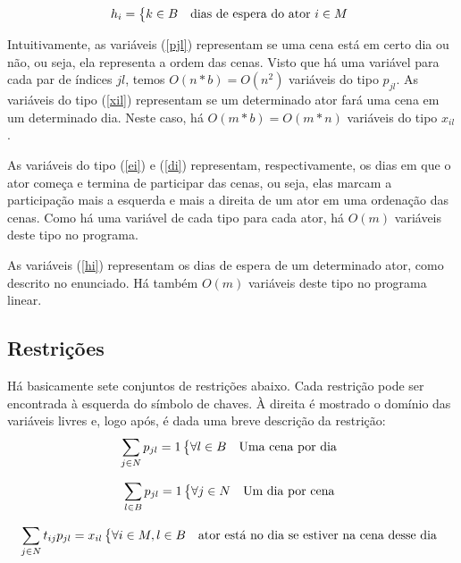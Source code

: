 \documentclass[a4paper,11pt]{article}
\begin{document}
\begin{equation}
  h_{i} = \begin{dcases*} k \in B & dias de espera do ator $i \in M$ \end{dcases*}
  \label{hi}
\end{equation}

Intuitivamente, as variáveis (\ref{pjl}) representam se uma cena está em certo dia
ou não, ou seja, ela representa a ordem das cenas. Visto que há uma variável para
cada par de índices $jl$, temos $O(n*b) = O(n^2)$ variáveis do tipo $p_{jl}$. As
variáveis do tipo (\ref{xil}) representam se um determinado ator fará uma cena
em um determinado dia. Neste caso, há $O(m*b) = O(m*n)$ variáveis do tipo $x_{il}$.

As variáveis do tipo (\ref{ei}) e (\ref{di}) representam, respectivamente, os dias em que o ator
começa e termina de participar das cenas, ou seja, elas marcam a participação
mais a esquerda e mais a direita de um ator em uma ordenação das cenas. Como há
uma variável de cada tipo para cada ator, há $O(m)$ variáveis deste tipo no programa.

As variáveis (\ref{hi}) representam os dias de espera de um determinado ator, como
descrito no enunciado. Há também $O(m)$ variáveis deste tipo no programa linear.
\subsection{Restrições}
Há basicamente sete conjuntos de restrições abaixo. Cada restrição pode ser encontrada
à esquerda do símbolo de chaves. À direita é mostrado o domínio das variáveis livres
e, logo após, é dada uma breve descrição da restrição:
\begin{equation}
  \sum_{j \in N} p_{jl} = 1 \begin{dcases*} \forall l \in B & Uma cena por dia \end{dcases*}
  \label{cena_dia}
\end{equation}

\begin{equation}
  \sum_{l \in B} p_{jl} = 1 \begin{dcases*} \forall j \in N & Um dia por cena \end{dcases*}
  \label{dia_cena}
\end{equation}

\begin{equation}
  \sum_{j \in N} t_{ij} p_{jl} = x_{il} \begin{dcases*} \forall i \in M, l \in B & ator está no dia se estiver na cena desse dia \end{dcases*}
  \label{actor_cene_day}
\end{equation}
\end{document}
